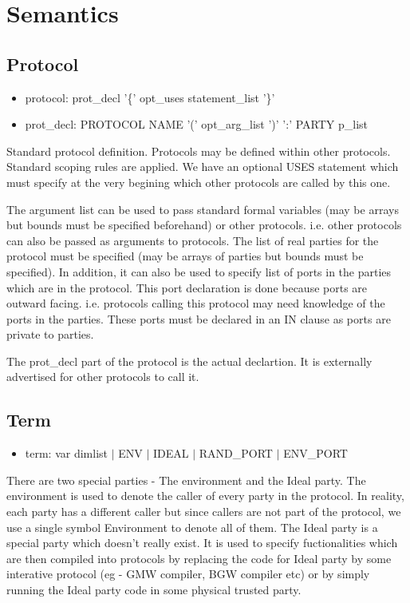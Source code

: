 
\section{Semantics}

\subsection{Protocol}

\begin{itemize}
\item protocol: prot\_decl '\{' opt\_uses statement\_list '\}'
\item prot\_decl: PROTOCOL NAME '(' opt\_arg\_list ')' ':' PARTY p\_list
\end{itemize}

Standard protocol definition. Protocols may be defined within other protocols. Standard scoping rules are applied. We have an optional USES statement which must specify at the very begining which other protocols are called by this one.

The argument list can be used to pass standard formal variables (may be arrays but bounds must be specified beforehand) or other protocols. i.e. other protocols can also be passed as arguments to protocols. The list of real parties for the protocol must be specified (may be arrays of parties but bounds must be specified). In addition, it can also be used to specify list of ports in the parties which are in the protocol. This port declaration is done because ports are outward facing. i.e.
protocols calling this protocol may need knowledge of the ports in the parties. These ports must be declared in an IN clause as ports are private to parties.

The prot\_decl part of the protocol is the actual declartion. It is externally advertised for other protocols to call it.

\subsection{Term}
\begin{itemize}
\item term: var dimlist $|$ ENV $|$ IDEAL $|$ RAND\_PORT $|$ ENV\_PORT
\end{itemize}

There are two special parties - The environment and the Ideal party. The environment is used to denote the caller of every party in the protocol. In reality, each party has a different caller but since callers are not part of the protocol, we use a single symbol Environment to denote all of them. The Ideal party is a special party which doesn't really exist. It is used to specify fuctionalities which are then compiled into protocols by replacing the code for Ideal party by some interative
protocol (eg - GMW compiler, BGW compiler etc) or by simply running the Ideal party code in some physical trusted party.

